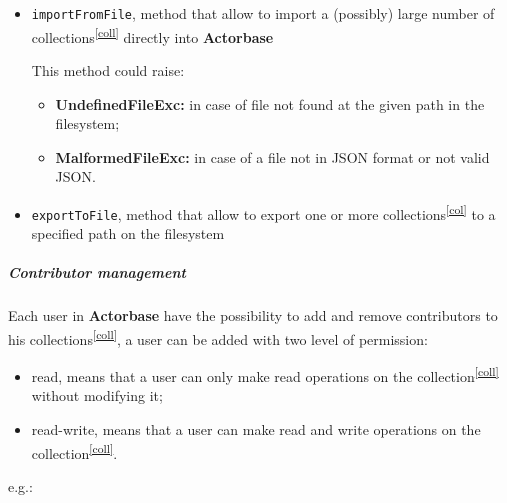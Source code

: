 \documentclass{scalatekids-article}
\begin{document}
{\begin{itemize}
  \item \verb=importFromFile=, method that allow to import a (possibly) large number of collections\textsuperscript{\ref{coll}}
    directly into \textbf{Actorbase}

    This method could raise:
    \begin{itemize}
    \item \textbf{UndefinedFileExc:} in case of file not found at the given path in the filesystem;
    \item \textbf{MalformedFileExc:} in case of a file not in JSON format or not valid JSON.
    \end{itemize}

  \item \verb=exportToFile=, method that allow to export one or more collections\textsuperscript{\ref{col}} to a specified path on the filesystem

  \end{itemize}

  \subparagraph{Contributor management}

  Each user in \textbf{Actorbase} have the possibility to add and remove contributors
  to his collections\textsuperscript{\ref{coll}}, a user can be added with two level of
  permission:
  \begin{itemize}
  \item read, means that a user can only make read operations on the collection\textsuperscript{\ref{coll}} without modifying it;
  \item read-write, means that a user can make read and write operations on the collection\textsuperscript{\ref{coll}}.
  \end{itemize}
  e.g.:

}
\end{document}
